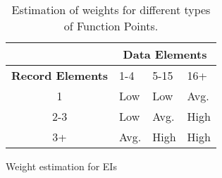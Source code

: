 \begin{table}[h]
\begin{subtable}{\textwidth}
    \centering
    \begin{tabular}{| c | l | l | l |}
        \hline
         & \multicolumn{3}{c|}{\textbf{Data Elements}} \\
        \hline
        \textbf{Record Elements} & 1-4 & 5-15 & 16+ \\
        \hline
        1       & Low     & Low     & Avg.     \\
        2-3     & Low     & Avg.    & High     \\
        3+      & Avg.    & High    & High     \\
        \hline
    \end{tabular}
    \caption{Weight estimation for EIs}
\end{subtable}
\caption{Estimation of weights for different types of Function Points.}
\label{tab:weight-estimation}
\end{table}
